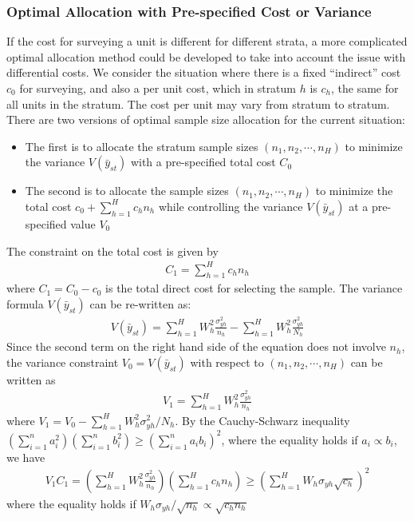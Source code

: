 \documentclass[a4paper,twoside,11pt]{article}
\begin{document}
{\subsubsection{Optimal Allocation with Pre-specified Cost or Variance}
If the cost for surveying a unit is different for different strata, a more complicated optimal allocation method could be developed to take into account the issue with differential costs. We consider the situation where there is a fixed “indirect” cost $c_0$ for surveying, and also a per unit cost, which in stratum $h$ is $c_h$, the same for all units in the stratum. The cost per unit may vary from stratum to stratum. There are two versions of optimal sample size allocation for the current situation:
\begin{itemize}
    \item The first is to allocate the stratum sample sizes $(n_1,n_2,\cdots,n_H)$ to minimize the variance $V(\bar{y}_{st})$ with a pre-specified total cost $C_0$
    \item The second is to allocate the sample sizes $(n_1,n_2,\cdots, n_H)$ to minimize the total cost $c_0 + \sum^H_{h=1} c_hn_h$ while controlling the variance $V(\bar{y}_{st})$ at a pre-specified value $V_0$
\end{itemize}
The constraint on the total cost is given by
\begin{equation*}
\begin{aligned}
C_1 = \sum^H_{h=1} c_h n_h
\end{aligned}
\end{equation*}
where $C_1= C_0 -c_0$ is the total direct cost for selecting the sample. The variance formula $V(\bar{y}_{st})$ can be re-written as:
\begin{equation*}
\begin{aligned}
V(\bar{y}_{st}) = \sum^H_{h=1} W_h^2 \frac{\sigma^2_{yh}}{n_h} - \sum^H_{h=1} W_h^2 \frac{\sigma_{yh}^2}{N_h}
\end{aligned}
\end{equation*}
Since the second term on the right hand side of the equation does not involve $n_h$, the variance constraint $V_0 = V(\bar{y}_{st})$ with respect to $(n_1,n_2,\cdots,n_H)$ can be written as
\begin{equation*}
\begin{aligned}
V_1 = \sum^H_{h=1} W_h^2 \frac{\sigma_{yh}^2}{n_h}
\end{aligned}
\end{equation*}
where $V_1 = V_0 - \sum^H_{h=1} W_h^2 \sigma_{yh}^2/N_h$. By the Cauchy-Schwarz inequality $(\sum^n_{i=1} a_i^2)(\sum^n_{i=1}b_i^2) \ge (\sum^n_{i=1}a_ib_i)^2$, where the equality holds if $a_i \propto b_i$, we have
\begin{equation*}
\begin{aligned}
V_1C_1 = (\sum^H_{h=1} W_h^2 \frac{\sigma_{yh}^2}{n_h})(\sum^H_{h=1}c_hn_h) \ge (\sum^H_{h=1}W_h \sigma_{yh} \sqrt{c_h})^2
\end{aligned}
\end{equation*}
where the equality holds if $W_h \sigma_{yh} /\sqrt{n_h} \propto \sqrt{c_hn_h}$}
\end{document}
